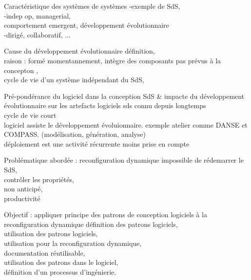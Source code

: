 

\begin{frame}{Caractéristique des systèmes de systèmes}
-exemple de SdS,\\
-indep op, managerial, \\
comportement emergent, développement évolutionnaire\\
-dirigé, collaboratif, ...
\end{frame}

\begin{frame}{Cause du développement évolutionnaire}
définition, \\
raison : 
formé momentannement, 
intègre des composants pas prévus à la concepton ,\\
cycle de vie d'un système indépendant du SdS,\\
\end{frame}

\begin{frame}{Pré-pondérance du logiciel dans la conception SdS \& impacte du développement évolutionnaire sur les artefacts logiciels}
sds connu depuis longtemps\\
cycle de vie court\\
logiciel assiste le développement évoluionnaire. 
exemple atelier comme DANSE et COMPASS. (modélisation, génération, analyse)\\
déploiement est une activité récurrente moins prise en compte
\end{frame}


\begin{frame}{Problématique abordée : reconfiguration dynamique}
impossible de 
rédemarrer le SdS,\\
contrôler les propriétés, \\
non anticipé, \\
productivité
\end{frame}

\begin{frame}{Objectif : appliquer principe des patrons de conception logiciels à la reconfiguration dynamique}
définition des patrons logiciels,\\
utilisation des patrons logiciels,\\
utilisation pour la reconfiguration dynamique,\\
documentation réutilisable,\\
utilisation des patrons dans le logiciel,\\
définition d'un processus d'ingénierie.
\end{frame}

